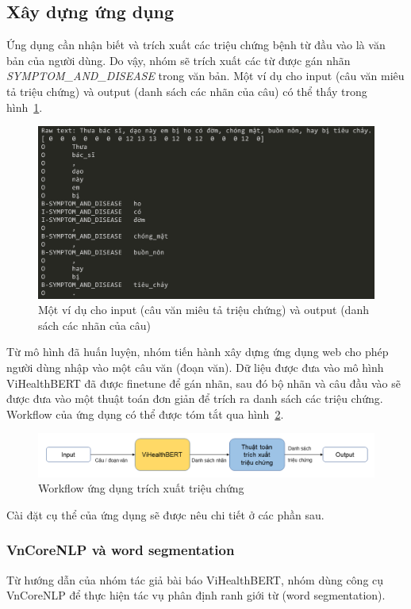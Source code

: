 \subsection{Xây dựng ứng dụng}
Ứng dụng cần nhận biết và trích xuất các triệu chứng bệnh từ đầu vào là văn bản của người dùng. Do vậy, nhóm sẽ trích xuất các từ được gán nhãn \textit{SYMPTOM\_AND\_DISEASE} trong văn bản. Một ví dụ cho input (câu văn miêu tả triệu chứng) và output (danh sách các nhãn của câu) có thể thấy trong hình~\ref{fig:example-result}.
\begin{figure}
\centering
\includegraphics[scale=.5]{img/example-result.png}
\caption{Một ví dụ cho input (câu văn miêu tả triệu chứng) và output (danh sách các nhãn của câu)}
\label{fig:example-result}
\end{figure}

Từ mô hình đã huấn luyện, nhóm tiến hành xây dựng ứng dụng web cho phép người dùng nhập vào một câu văn (đoạn văn). Dữ liệu được đưa vào mô hình ViHealthBERT đã được finetune để gán nhãn, sau đó bộ nhãn và câu đầu vào sẽ được đưa vào một thuật toán đơn giản để trích ra danh sách các triệu chứng. Workflow của ứng dụng có thể được tóm tắt qua hình~\ref{fig:workflow}.
\begin{figure}
\centering
\includegraphics[scale=.6]{img/workflow.png}
\caption{Workflow ứng dụng trích xuất triệu chứng}
\label{fig:workflow}
\end{figure}
Cài đặt cụ thể của ứng dụng sẽ được nêu chi tiết ở các phần sau.

\subsubsection{VnCoreNLP và word segmentation}
Từ hướng dẫn của nhóm tác giả bài báo ViHealthBERT, nhóm dùng công cụ VnCoreNLP để thực hiện tác vụ phân định ranh giới từ (word segmentation).

